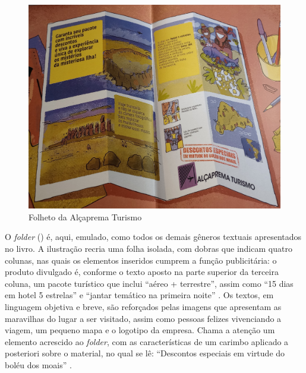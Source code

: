 \documentclass[portuguese]{textolivre}
\begin{document}
\begin{figure}[htbp]
  \centering
  \begin{minipage}{.85\textwidth}
    \includegraphics[width=\linewidth]{Fig1.jpeg}
    \caption{Folheto da Alçaprema Turismo}
    \label{fig1}
  \end{minipage}
\end{figure}

O \textit{folder} () é, aqui, emulado, como todos os demais gêneros
textuais apresentados no livro. A ilustração recria uma folha isolada, com
dobras que indicam quatro colunas, nas quais os elementos inseridos cumprem a
função publicitária: o produto divulgado é, conforme o texto aposto na parte
superior da terceira coluna, um pacote turístico que inclui “aéreo +
terrestre”, assim como “15 dias em hotel 5 estrelas” e “jantar temático na
primeira noite” \cite[p.~7]{franco_queda_2018}. Os textos, em linguagem
objetiva e breve, são reforçados pelas imagens que apresentam as maravilhas do
lugar a ser visitado, assim como pessoas felizes vivenciando a viagem, um
pequeno mapa e o logotipo da empresa. Chama a atenção um elemento acrescido ao
\textit{folder}, com as características de um carimbo aplicado a posteriori
sobre o material, no qual se lê: “Descontos especiais em virtude do boléu dos
moais” \cite[p.~7]{franco_queda_2018}.
\end{document}
